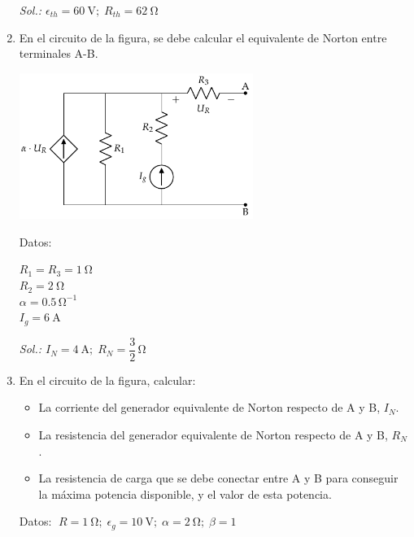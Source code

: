 \begin{enumerate}
    \emph{Sol.:\; $\epsilon_{th}=\qty{60}{\volt};\; R_{th}=\qty{62}{\ohm}$}


    \item En el circuito de la figura, se debe calcular el equivalente de Norton entre terminales A-B.

    \begin{minipage}{0.6\linewidth}
      \includegraphics[height=4.75cm]{../figs/BT1_ej19_enunciado.pdf}
    \end{minipage}
    \begin{minipage}{0.4\linewidth}
      Datos:
      \vspace{2mm}
      
      $R_1 = R_3 = \qty{1}{\ohm}$\\[1mm]
      $R_2 = \qty{2}{\ohm}$\\[1mm]
      $\alpha = 0.5\,\si{\ohm}^{-1}$\\[1mm]
      $I_g = \qty{6}{\ampere}$
    \end{minipage}

    \emph{Sol.:\; 
      $I_N = \qty{4}{\ampere};\; R_N = \dfrac{3}{2}\,\si{\ohm}$}
      

  \item En el circuito de la figura, calcular:
    \begin{itemize}
    \item La corriente del generador equivalente de Norton respecto de
      A y B, $I_N$.
    \item La resistencia del generador equivalente de Norton respecto
      de A y B, $R_N$.
    \item La resistencia de carga que se debe conectar entre A y B
      para conseguir la máxima potencia disponible, y el valor de esta
      potencia.
    \end{itemize}
    Datos:
    $\; R = \qty{1}{\ohm};\; \epsilon_g = \qty{10}{\volt};\; \alpha = \qty{2}{\ohm};\; \beta = 1$


\end{enumerate}
